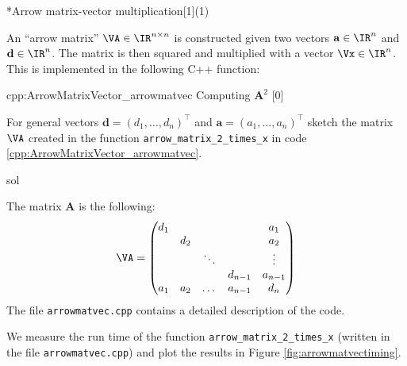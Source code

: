 
\begin{samproblem}*{}{Arrow matrix-vector multiplication}[1](1){
    An ``arrow matrix'' $\VA \in \IR^{n \times n}$ is constructed given two vectors $\mathbf{a} \in \IR^n$ and $\mathbf{d} \in \IR^n$.
    The matrix is then squared and multiplied with a vector $\Vx \in \IR^n$. This is implemented in the
    following C++ function:
    \begin{samcode}[C++11-code]{cpp:ArrowMatrixVector_arrowmatvec}
      {Computing $\mathbf{A}^2$}
[0]
\end{samcode}
}

\begin{subproblem}{}

  For general vectors $\mathbf{d} = (d_1, \dots, d_n)^\top$ and
  $\mathbf{a} = (a_1, \dots, a_n)^\top$
  sketch the matrix $\VA$ created in the function \texttt{arrow\_matrix\_2\_times\_x}
  in code \ref{cpp:ArrowMatrixVector_arrowmatvec}.

  \begin{samwriteprbpart}{sol}
  \begin{samsolution}
    The matrix $\mathbf{A}$ is the following:
    \begin{align}
    \VA=\begin{pmatrix}
      d_1 &     &        &         & a_1     \\
          & d_2 &        &         & a_2     \\
          &     & \ddots &         & \vdots  \\
          &     &        & d_{n-1} & a_{n-1} \\
      a_1 & a_2 & \dots  & a_{n-1} & d_n     \\
    \end{pmatrix}
    \end{align}
    The file \texttt{arrowmatvec.cpp} contains a detailed description of the code.
  \end{samsolution}
\end{samwriteprbpart}
\end{subproblem}

\begin{subproblem}{}
  We measure the run time of the function \texttt{arrow\_matrix\_2\_times\_x} (written in the
  file \texttt{arrowmatvec.cpp})
  and plot the results in Figure \ref{fig:arrowmatvectiming}.


\end{subproblem}
\end{samproblem}
